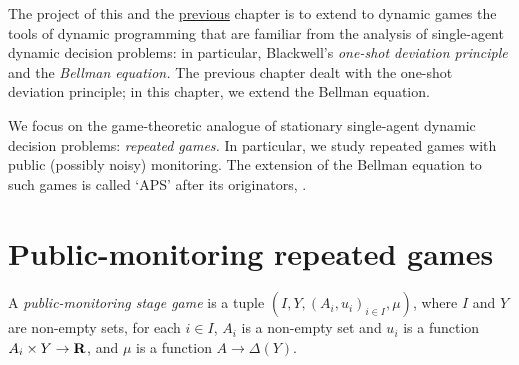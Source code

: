 




The project of this and the \hyperref[ch_osdp]{previous} chapter is to extend to dynamic games the tools of dynamic programming that are familiar from the analysis of single-agent dynamic decision problems: in particular, Blackwell's \emph{one-shot deviation principle} and the \emph{Bellman equation.} The previous chapter dealt with the one-shot deviation principle; in this chapter, we extend the Bellman equation.

We focus on the game-theoretic analogue of stationary single-agent dynamic decision problems: \emph{repeated games.} In particular, we study repeated games with public (possibly noisy) monitoring. The extension of the Bellman equation to such games is called `APS' after its originators, \textcite{AbreuPearceStacchetti1990}.



\section{Public-monitoring repeated games}
\label{aps:games}

\begin{definition}
	\label{definition:stage_game}
	A \emph{public-monitoring stage game} is a tuple $\left( I, Y, (A_i, u_i)_{i \in I}, \mu \right)$, where $I$ and $Y$ are non-empty sets, for each $i \in I$, $A_i$ is a non-empty set and $u_i$ is a function $A_i \times Y \to \mathbf{R}$, and $\mu$ is a function $A \to \Delta(Y)$.
\end{definition}

